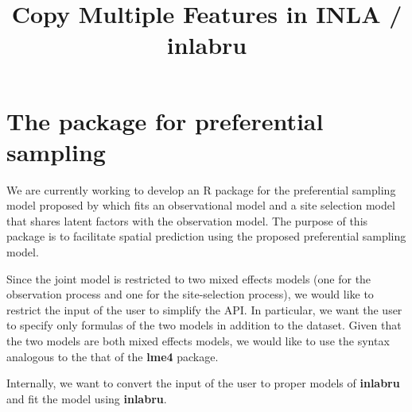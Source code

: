 \documentclass{article}
\title{Copy Multiple Features in INLA / inlabru}
\begin{document}
\maketitle

\section{The package for preferential sampling}
We are currently working to develop an R package for the preferential sampling model proposed
by \cite{Watson2019_pref_samp} which fits an observational model and a site selection model
that shares latent factors with the observation model. 
The purpose of this package is to facilitate spatial prediction using the proposed preferential
sampling model.

Since the joint model is restricted to two mixed effects models (one for the observation process 
and one for the site-selection process),  we would like to restrict the input of the user to simplify the API. 
In particular, we want the user to specify only formulas of the two models in addition to the dataset. 
Given that the two models are both mixed effects models, we would like to use the syntax
analogous to the that of the \textbf{lme4} package.

Internally, we want to convert the input of the user to proper models of \textbf{inlabru} and fit
the model using \textbf{inlabru}.

%
%
\end{document}
